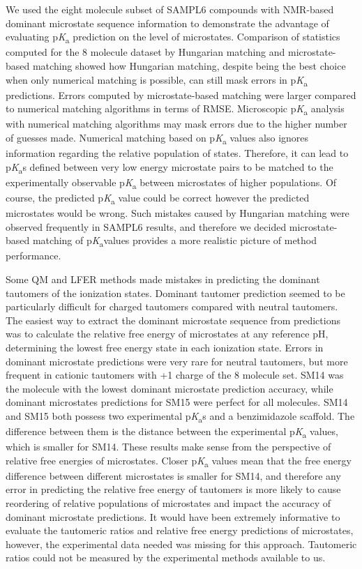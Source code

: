 \documentclass[9pt,lineno,final]{elife}
\newcommand{\pKa}{p\textit{K}\textsubscript{a}}
\begin{document}
We used the eight molecule subset of SAMPL6 compounds with NMR-based dominant microstate sequence information to demonstrate the advantage of evaluating \pKa{} prediction on the level of microstates.
Comparison of statistics computed for the 8 molecule dataset by Hungarian matching and microstate-based matching showed how Hungarian matching, despite being the best choice when only numerical matching is possible, can still mask errors in \pKa{} predictions. 
Errors computed by microstate-based matching were larger compared to numerical matching algorithms in terms of RMSE.
Microscopic \pKa{} analysis with numerical matching algorithms may mask errors due to the higher number of guesses made.
Numerical matching based on \pKa{} values also ignores information regarding the relative population of states. 
Therefore, it can lead to \pKa{}s defined between very low energy microstate pairs to be matched to the experimentally observable \pKa{} between microstates of higher populations. 
Of course, the predicted \pKa{} value could be correct however the predicted microstates would be wrong. 
Such mistakes caused by Hungarian matching were observed frequently in SAMPL6 results, and therefore we decided microstate-based matching of \pKa values provides a more realistic picture of method performance.  

Some QM and LFER methods made mistakes in predicting the dominant tautomers of the ionization states. 
Dominant tautomer prediction seemed to be particularly difficult for charged tautomers compared with neutral tautomers. 
The easiest way to extract the dominant microstate sequence from predictions was to calculate the relative free energy of microstates at any reference pH, determining the lowest free energy state in each ionization state.
Errors in dominant microstate predictions were very rare for neutral tautomers, but more frequent in cationic tautomers with +1 charge of the 8 molecule set. 
SM14 was the molecule with the lowest dominant microstate prediction accuracy, while dominant microstates predictions for SM15 were perfect for all molecules. 
SM14 and SM15 both possess two experimental \pKa{}s and a benzimidazole scaffold. 
The difference between them is the distance between the experimental \pKa{} values, which is smaller for SM14. 
These results make sense from the perspective of relative free energies of microstates. 
Closer \pKa{} values mean that the free energy difference between different microstates is smaller for SM14, and therefore any error in predicting the relative free energy of tautomers is more likely to cause reordering of relative populations of microstates and impact the accuracy of dominant microstate predictions. 
It would have been extremely informative to evaluate the tautomeric ratios and relative free energy predictions of microstates, however, the experimental data needed was missing for this approach. Tautomeric ratios could not be measured by the experimental methods available to us.
\end{document}
